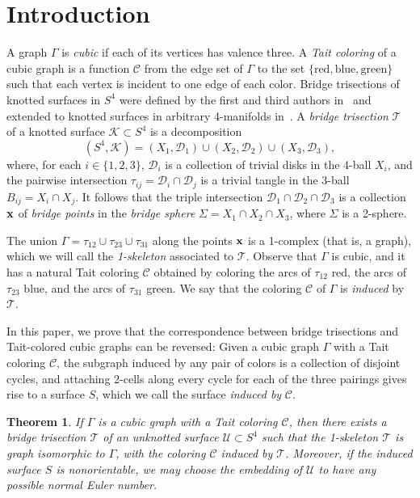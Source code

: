 \documentclass[11pt, oneside]{amsart}
\theoremstyle{theorem}
\newtheorem{theorem}{Theorem}[section]
\theoremstyle{definition}
\newcommand{\D}{\mathcal D}
\theoremstyle{theorem}
\begin{document}
\section{Introduction}\label{intro}

A graph $\Gamma$ is \emph{cubic} if each of its vertices has valence three.  A \emph{Tait coloring} of a cubic graph is a function $\mathcal C$ from the edge set of $\Gamma$ to the set $\{\text{red}, \text{blue}, \text{green}\}$ such that each vertex is incident to one edge of each color.  Bridge trisections of knotted surfaces in $S^4$ were defined by the first and third authors in~\cite{MZB1} and extended to knotted surfaces in arbitrary 4-manifolds in~\cite{MZB2}.  A \emph{bridge trisection} $\mathcal T$ of a knotted surface $\mathcal K \subset S^4$ is a decomposition
\[ (S^4,\mathcal K) = (X_1,\mathcal D_1) \cup (X_2,\mathcal D_2) \cup (X_3, \mathcal D_3),\]
where, for each $i\in\{1,2,3\}$, $\mathcal D_i$ is a collection of trivial disks in the 4-ball $X_i$, and the pairwise intersection $\tau_{ij} = \D_i \cap \D_j$ is a trivial tangle in the 3-ball $B_{ij} = X_i \cap X_j$.
It follows that the triple intersection $\D_1 \cap \D_2 \cap \D_3$ is a collection $\bold x$ of \emph{bridge points} in the \emph{bridge sphere} $\Sigma = X_1 \cap X_2 \cap X_3$, where $\Sigma$ is a 2-sphere.

The union $\Gamma = \tau_{12} \cup \tau_{23} \cup \tau_{31}$ along the points $\bold x$ is a 1-complex (that is, a graph), which we will call the \emph{1-skeleton} associated to $\mathcal T$.  Observe that $\Gamma$ is cubic, and it has a natural Tait coloring $\mathcal C$ obtained by coloring the arcs of $\tau_{12}$ red, the arcs of $\tau_{23}$ blue, and the arcs of $\tau_{31}$ green.  We say that the coloring $\mathcal C$ of $\Gamma$ is \emph{induced} by $\mathcal T$.

In this paper, we prove that the correspondence between bridge trisections and Tait-colored cubic graphs can be reversed:  Given a cubic graph $\Gamma$ with a Tait coloring $\mathcal C$, the subgraph induced by any pair of colors is a collection of disjoint cycles, and attaching 2-cells along every cycle for each of the three pairings gives rise to a surface $S$, which we call the surface \emph{induced by} $\mathcal{C}$.

\begin{theorem}
\label{main}
	If $\Gamma$ is a cubic graph with a Tait coloring $\mathcal C$, then there exists a bridge trisection $\mathcal T$ of an unknotted surface $\mathcal{U} \subset S^4$ such that the 1-skeleton $\mathcal T$ is graph isomorphic to $\Gamma$, with the coloring $\mathcal C$ induced by $\mathcal T$.  Moreover, if the induced surface $S$ is nonorientable, we may choose the embedding of $\mathcal{U}$ to have any possible normal Euler number.
\end{theorem}
\end{document}
